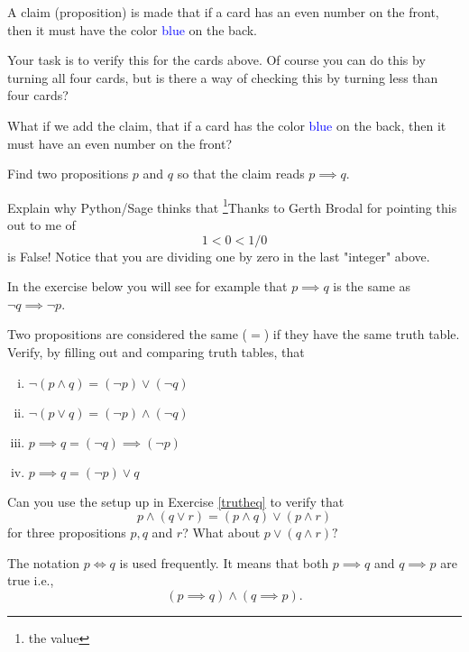 \documentclass{article}
\begin{document}
A claim (proposition) is made that if a card has an even number on the front, then it
must have the color \textcolor{blue}{blue} on the back.

Your task is to verify this for the cards above. Of course you can
do this by turning all four cards, but is there a way of checking this
by turning less than four cards?

What if we add the claim, that if a card has the color 
\textcolor{blue}{blue} on the back, then
it must have an even number on the front?

\begin{hint}[showhide]
  Find two propositions $p$ and $q$ so that the claim reads
  $p\implies q$.
\end{hint}
  
\endshex


\beginshex
Explain why Python/Sage thinks that \footnote{the value}{Thanks to Gerth Brodal for pointing this out to me} of
  $$
  1 < 0 < 1/0
  $$
  is False! Notice that you are dividing one by zero in the last "integer" above.
\endshex


In the exercise below you will see for example that
$p\implies q$ is the same as $\neg q \implies \neg p$.

\beginshex\label{trutheq}
Two propositions are considered the same ($=$) if they have the same truth table. Verify, by
filling out and comparing truth tables, that
\begin{enumerate}[(i)]
\item
$\neg (p \land q) = (\neg p) \lor (\neg q)$
\item
$\neg (p \lor q) = (\neg p) \land (\neg q)$
\item
$p \implies q = (\neg q) \implies (\neg p)$
\item
$p \implies q = (\neg p)\lor q$
\end{enumerate}
\endshex

\beginshex
Can you use the setup up in Exercise \ref{trutheq} to verify that
$$
p\land (q \lor r) = (p\land q) \lor (p \land r)
$$
for three propositions $p, q$ and $r$? What about
$
p\lor (q \land r)?
$
\endshex

The notation $p \iff q$ is used frequently. It means that both
$p\implies q$ and $q\implies p$ are true i.e.,
$$
(p\implies q) \land (q\implies p).
$$

\end{document}
